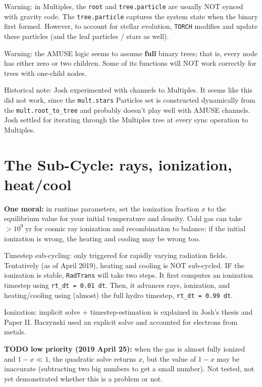 \documentclass[10pt]{article}
\newcommand*{\mt}{\mathrm}
\newcommand*{\unit}[1]{\;\mt{#1}}  %
\begin{document}
Warning: in Multiples, the \texttt{root} and \texttt{tree.particle} are usually
NOT synced with gravity code.  The \texttt{tree.particle} captures the system
state when the binary first formed.  However, to account for stellar evolution,
\texttt{TORCH} modifies and update these particles (and the leaf particles /
stars as well).

Warning: the AMUSE logic seems to assume \textbf{full} binary trees; that is,
every node has either zero or two children.  Some of its functions will NOT
work correctly for trees with one-child nodes.

Historical note: Josh experimented with channels to Multiples.  It seems like
this did not work, since the \texttt{mult.stars} Particles set is constructed
dynamically from the \texttt{mult.root\_to\_tree} and probably doesn't play
well with AMUSE channels.  Josh settled for iterating through the Multiples
tree at every sync operation to Multiples.



\section{The Sub-Cycle: rays, ionization, heat/cool}

\textbf{One moral:} in runtime parameters, set the ionization fraction $x$ to the
equilibrium value for your initial temperature and density.
Cold gas can take $> 10^9 \unit{yr}$ for cosmic ray ionization and
recombination to balance; if the initial ionization is wrong, the heating and
cooling may be wrong too.

Timestep sub-cycling: only triggered for rapidly varying radiation fields.
Tentatively (as of April 2019), heating and cooling is NOT sub-cycled.
IF the ionization is stable, \texttt{RadTrans} will take two steps.
It first computes an ionization timestep using \texttt{rt\_dt = 0.01 dt}.
Then, it advances rays, ionization, and heating/cooling using (almost) the full
hydro timestep, \texttt{rt\_dt = 0.99 dt}.

Ionization: implicit solve + timestep-estimation is explained in Josh's thesis
and Paper II.  Baczynski used an explicit solve and accounted for electrons
from metals.

\textbf{TODO low priority (2019 April 25):} when the gas is almost fully
ionized and $1-x \ll 1$, the quadratic solve returns $x$, but the value of
$1-x$ may be inaccurate (subtracting two big numbers to get a small number).
Not tested, not yet demonstrated whether this is a problem or not.
\end{document}
